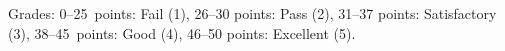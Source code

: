 \documentclass[a4paper,12pt]{letter}
\begin{document}

Grades: 0–25~points: Fail (1), 26–30 points: Pass (2), 31–37 points: Satisfactory (3), 38–45~points: Good (4), 46–50 points: Excellent (5).


\vfill
\end{document}
